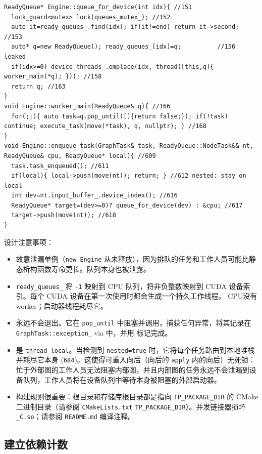 \begin{lstlisting}[caption={lazy queue and worker creation.}, label=lst:queuefordevice]
ReadyQueue* Engine::queue_for_device(int idx){ //151
  lock_guard<mutex> lock(queues_mutex_); //152
  auto it=ready_queues_.find(idx); if(it!=end) return it->second; //153
  auto* q=new ReadyQueue(); ready_queues_[idx]=q;          //156 leaked
  if(idx>=0) device_threads_.emplace(idx, thread([this,q]{ worker_main(*q); })); //158
  return q; //163
}
void Engine::worker_main(ReadyQueue& q){ //166
  for(;;){ auto task=q.pop_until([]{return false;}); if(!task) continue; execute_task(move(*task), q, nullptr); } //168
}
void Engine::enqueue_task(GraphTask& task, ReadyQueue::NodeTask&& nt, ReadyQueue& cpu, ReadyQueue* local){ //609
  task.task_enqueued(); //611
  if(local){ local->push(move(nt)); return; } //612 nested: stay on local
  int dev=nt.input_buffer_.device_index(); //616
  ReadyQueue* target=(dev>=0)? queue_for_device(dev) : &cpu; //617
  target->push(move(nt)); //618
}
\end{lstlisting}

设计注意事项：

\begin{itemize}[leftmargin=1.2em]
\item 故意泄漏单例（\texttt{new Engine} 从未释放），因为排队的任务和工作人员可能比静态析构函数寿命更长。队列本身也被泄露。
\item \texttt{ready\_queues\_} 将 \texttt{-1} 映射到 CPU 队列，将非负整数映射到 CUDA 设备索引。每个 CUDA 设备在第一次使用时都会生成一个持久工作线程。 CPU没有worker；启动器线程耗尽它。
\item 永远不会退出。它在 \texttt{pop\_until} 中阻塞并调用，捕获任何异常，将其记录在 \texttt{GraphTask::exception\_} via 中，并用 标记完成。
\item 是 \texttt{thread\_local}。当检测到 \texttt{nested=true} 时，它将每个任务路由到本地堆栈并耗尽它本身 (\texttt{684})。这使得可重入向后（向后的 \texttt{apply} 内的向后）无死锁：忙于外部图的工作人员无法阻塞内部图，并且内部图的任务永远不会泄漏到设备队列，工作人员将在设备队列中等待本身被阻塞的外部启动器。
\item 构建规则很重要：根目录和存储库根目录都是指向 \texttt{TP\_PACKAGE\_DIR} 的 CMake 二进制目录（请参阅 \texttt{CMakeLists.txt} \texttt{TP\_PACKAGE\_DIR}）。并发链接器损坏 \texttt{\_C.so}；请参阅 \texttt{README.md} 编译注释。
\end{itemize}

\subsection{建立依赖计数}
\label{subsec:dependencies}

